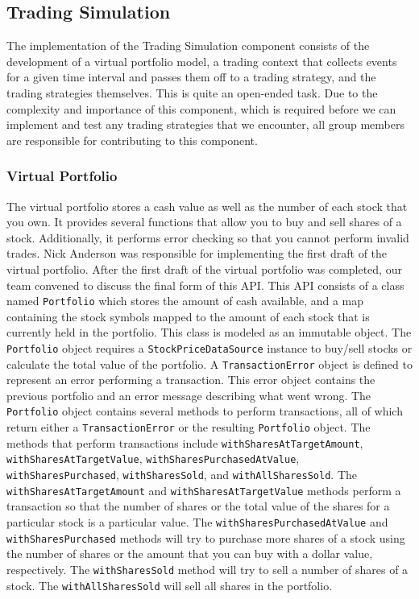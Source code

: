 \subsection{Trading Simulation}

The implementation of the Trading Simulation component consists of the development of a virtual portfolio model, a trading context that collects events for a given time interval and passes them off to a trading strategy, and the trading strategies themselves.
This is quite an open-ended task.
Due to the complexity and importance of this component, which is required before we can implement and test any trading strategies that we encounter, all group members are responsible for contributing to this component.

\subsubsection{Virtual Portfolio}

The virtual portfolio stores a cash value as well as the number of each stock that you own.
It provides several functions that allow you to buy and sell shares of a stock.
Additionally, it performs error checking so that you cannot perform invalid trades.
Nick Anderson was responsible for implementing the first draft of the virtual portfolio.
After the first draft of the virtual portfolio was completed, our team convened to discuss the final form of this API.
This API consists of a class named \texttt{Portfolio} which stores the amount of cash available, and a map containing the stock symbols mapped to the amount of each stock that is currently held in the portfolio.
This class is modeled as an immutable object.
The \texttt{Portfolio} object requires a \texttt{StockPriceDataSource} instance to buy/sell stocks or calculate the total value of the portfolio.
A \texttt{TransactionError} object is defined to represent an error performing a transaction.
This error object contains the previous portfolio and an error message describing what went wrong.
The \texttt{Portfolio} object contains several methods to perform transactions, all of which return either a \texttt{TransactionError} or the resulting \texttt{Portfolio} object.
The methods that perform transactions include \texttt{with\-Shares\-At\-Target\-Amount}, \texttt{with\-Shares\-At\-Target\-Value}, \texttt{with\-Shares\-Purchased\-At\-Value}, \texttt{with\-Shares\-Purchased}, \texttt{with\-Shares\-Sold}, and \texttt{with\-All\-Shares\-Sold}.
The \texttt{with\-Shares\-At\-Target\-Amount} and \texttt{with\-Shares\-At\-Target\-Value} methods perform a transaction so that the number of shares or the total value of the shares for a particular stock is a particular value.
The \texttt{with\-Shares\-Purchased\-At\-Value} and \texttt{with\-Shares\-Purchased} methods will try to purchase more shares of a stock using the number of shares or the amount that you can buy with a dollar value, respectively.
The \texttt{with\-Shares\-Sold} method will try to sell a number of shares of a stock.
The \texttt{with\-All\-Shares\-Sold} will sell all shares in the portfolio.
 
